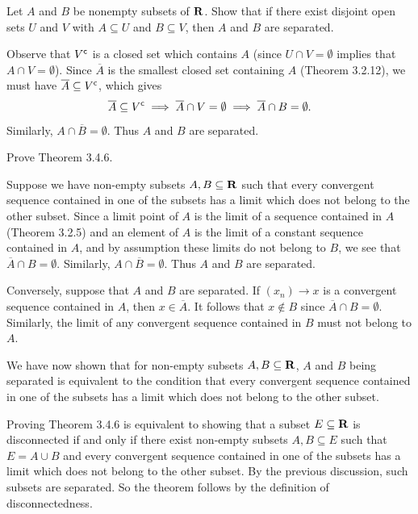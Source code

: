 \documentclass{lew98_solutions}
\begin{document}
\begin{exercise}
\label{ex:3.4.5}
    Let \( A \) and \( B \) be nonempty subsets of \( \mathbf{R} \). Show that if there exist disjoint open sets \( U \) and \( V \) with \( A \subseteq U \) and \( B \subseteq V \), then \( A \) and \( B \) are separated.
\end{exercise}

\begin{solution}
    Observe that \( V^{\mathsf{c}} \) is a closed set which contains \( A \) (since \( U \cap V = \emptyset \) implies that \( A \cap V = \emptyset \)). Since \( \overline{A} \) is the smallest closed set containing \( A \) (Theorem 3.2.12), we must have \( \overline{A} \subseteq V^{\mathsf{c}} \), which gives
    \[
        \overline{A} \subseteq V^{\mathsf{c}} \implies \overline{A} \cap V = \emptyset \implies \overline{A} \cap B = \emptyset.
    \]
    Similarly, \( A \cap \overline{B} = \emptyset \). Thus \( A \) and \( B \) are separated.
\end{solution}

\begin{exercise}
\label{ex:3.4.6}
    Prove Theorem 3.4.6.
\end{exercise}

\begin{solution}
    Suppose we have non-empty subsets \( A, B \subseteq \mathbf{R} \) such that every convergent sequence contained in one of the subsets has a limit which does not belong to the other subset. Since a limit point of \( A \) is the limit of a sequence contained in \( A \) (Theorem 3.2.5) and an element of \( A \) is the limit of a constant sequence contained in \( A \), and by assumption these limits do not belong to \( B \), we see that \( \overline{A} \cap B = \emptyset \). Similarly, \( A \cap \overline{B} = \emptyset \). Thus \( A \) and \( B \) are separated.

    Conversely, suppose that \( A \) and \( B \) are separated. If \( (x_n) \to x \) is a convergent sequence contained in \( A \), then \( x \in \overline{A} \). It follows that \( x \not\in B \) since \( \overline{A} \cap B = \emptyset \). Similarly, the limit of any convergent sequence contained in \( B \) must not belong to \( A \).

    We have now shown that for non-empty subsets \( A, B \subseteq \mathbf{R} \), \( A \) and \( B \) being separated is equivalent to the condition that every convergent sequence contained in one of the subsets has a limit which does not belong to the other subset.

    Proving Theorem 3.4.6 is equivalent to showing that a subset \( E \subseteq \mathbf{R} \) is disconnected if and only if there exist non-empty subsets \( A, B \subseteq E \) such that \( E = A \cup B \) and every convergent sequence contained in one of the subsets has a limit which does not belong to the other subset. By the previous discussion, such subsets are separated. So the theorem follows by the definition of disconnectedness.
\end{solution}
\end{document}
